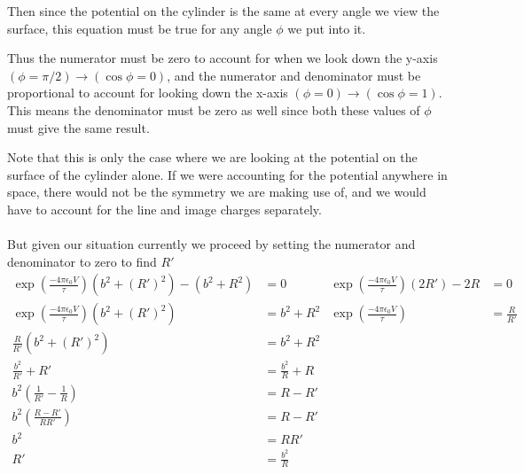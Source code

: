 \documentclass{article}
\begin{document}
Then since the potential on the cylinder is the same at every angle we view the surface, this equation must be true for any angle $\phi$ we put into it.

Thus the numerator must be zero to account for when we look down the y-axis $(\phi=\pi/2)\to(\cos\phi=0)$, and the numerator and denominator must be proportional to account for looking down the x-axis $(\phi=0)\to(\cos\phi=1)$. This means the denominator must be zero as well since both these values of $\phi$ must give the same result.

Note that this is only the case where we are looking at the potential on the surface of the cylinder alone. If we were accounting for the potential anywhere in space, there would not be the symmetry we are making use of, and we would have to account for the line and image charges separately.

\paragraph{}
But given our situation currently we proceed by setting the numerator and denominator to zero to find $R'$
\begin{align*}
\exp\left(\frac{-4\pi\epsilon_{0}V}{\tau}\right)(b^{2} + (R')^{2}) - (b^{2} + R^{2}) &= 0 & \exp\left(\frac{-4\pi\epsilon_{0}V}{\tau}\right)(2R') - 2R&=0\\
\exp\left(\frac{-4\pi\epsilon_{0}V}{\tau}\right)(b^{2} + (R')^{2}) &= b^{2} + R^{2} & \exp\left(\frac{-4\pi\epsilon_{0}V}{\tau}\right)&=\frac{R}{R'}\\
\frac{R}{R'}(b^{2} + (R')^{2}) &= b^{2} + R^{2}\\
\frac{b^{2}}{R'} + R' &= \frac{b^{2}}{R} + R\\
b^{2} \left(\frac{1}{R'} - \frac{1}{R}\right) &= R - R'\\
b^{2} \left(\frac{R-R'}{RR'}\right) &= R - R'\\
b^{2} &= RR'\\
R' &= \boxed{\frac{b^{2}}{R}}
\end{align*}
\end{document}

